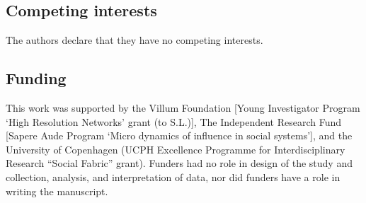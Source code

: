 \documentclass[fleqn,10pt]{wlscirep}
\begin{document}
\subsection*{Competing interests}
The authors declare that they have no competing interests.

\subsection*{Funding}
This work was supported by the Villum Foundation [Young Investigator Program `High Resolution Networks' grant (to S.L.)], The Independent Research Fund [Sapere Aude Program `Micro dynamics of influence in social systems'], and the University of Copenhagen (UCPH Excellence Programme for Interdisciplinary Research “Social Fabric” grant). Funders had no role in design of the study and collection, analysis, and interpretation of data, nor did funders have a role in writing the manuscript.
\end{document}
